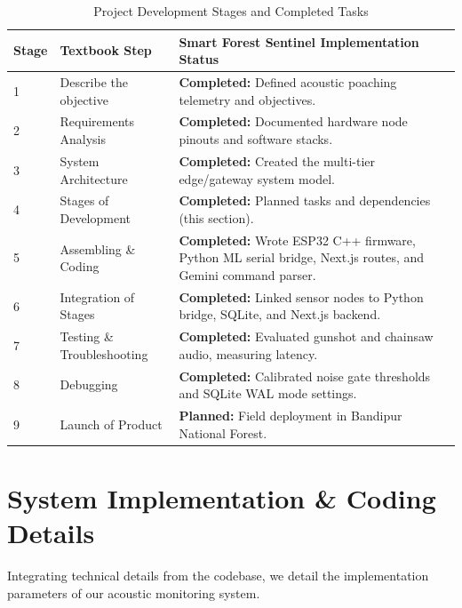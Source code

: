\documentclass[11pt,a4paper]{article}
\begin{document}
\begin{table}[H]
    \centering
    \caption{Project Development Stages and Completed Tasks}
    \begin{tabular}{lp{5.5cm}p{7cm}}
        \toprule
        \textbf{Stage} & \textbf{Textbook Step} & \textbf{Smart Forest Sentinel Implementation Status} \\
        \midrule
        1 & Describe the objective & \textbf{Completed:} Defined acoustic poaching telemetry and objectives. \\
        2 & Requirements Analysis & \textbf{Completed:} Documented hardware node pinouts and software stacks. \\
        3 & System Architecture & \textbf{Completed:} Created the multi-tier edge/gateway system model. \\
        4 & Stages of Development & \textbf{Completed:} Planned tasks and dependencies (this section). \\
        5 & Assembling \& Coding & \textbf{Completed:} Wrote ESP32 C++ firmware, Python ML serial bridge, Next.js routes, and Gemini command parser. \\
        6 & Integration of Stages & \textbf{Completed:} Linked sensor nodes to Python bridge, SQLite, and Next.js backend. \\
        7 & Testing \& Troubleshooting & \textbf{Completed:} Evaluated gunshot and chainsaw audio, measuring latency. \\
        8 & Debugging & \textbf{Completed:} Calibrated noise gate thresholds and SQLite WAL mode settings. \\
        9 & Launch of Product & \textbf{Planned:} Field deployment in Bandipur National Forest. \\
        \bottomrule
    \end{tabular}
\end{table}

\newpage

\section{System Implementation \& Coding Details}
Integrating technical details from the codebase, we detail the implementation parameters of our acoustic monitoring system.
\end{document}
